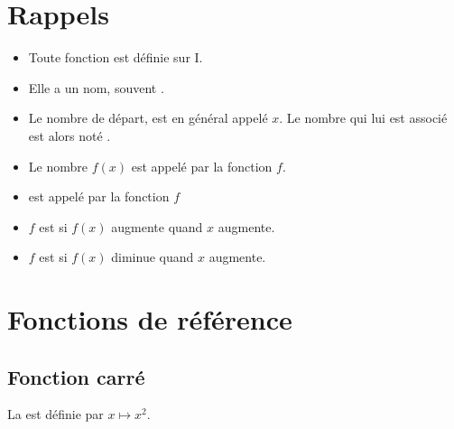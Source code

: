 \documentclass[12pt,a4paper]{article}
\date{}
\title{}
\begin{document}
{}

\section{Rappels}



\begin{mydefs}
	
	\begin{itemize}
		\item Toute fonction est définie sur  I.
		
		\item Elle a un nom, souvent .
		
		\item Le nombre de départ,  est en général appelé $x$. Le nombre qui lui est associé est alors noté .
		
		\item Le nombre $f(x)$ est appelé  par la fonction $f$.
		
		\item {} est appelé  par la fonction $f$
		
		\item $f$ est  si $f(x)$ augmente quand $x$ augmente.
		
		\item $f$ est  si $f(x)$ diminue quand $x$ augmente.
	\end{itemize}
	

\end{mydefs}



\section{Fonctions de référence}

\subsection{Fonction carré}

\begin{mydef}
	La  est définie par $x \mapsto x^2$.
\end{mydef}
\end{document}
